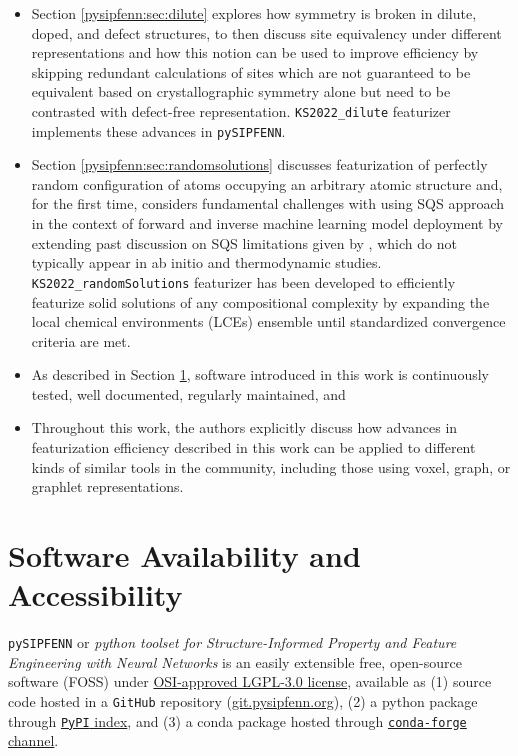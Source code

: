 \begin{itemize}
    
    \item Section \ref{pysipfenn:sec:dilute} explores how symmetry is broken in dilute, doped, and defect structures, to then discuss site equivalency under different representations and how this notion can be used to improve efficiency by skipping redundant calculations of sites which are not guaranteed to be equivalent based on crystallographic symmetry alone but need to be contrasted with defect-free representation. \texttt{KS2022\_dilute} featurizer implements these advances in \texttt{pySIPFENN}.

    \item Section \ref{pysipfenn:sec:randomsolutions} discusses featurization of perfectly random configuration of atoms occupying an arbitrary atomic structure and, for the first time, considers fundamental challenges with using SQS approach in the context of forward and inverse machine learning model deployment by extending past discussion on SQS limitations given by \citet{VanDeWalle2013EfficientStructures}, which do not typically appear in ab initio and thermodynamic studies. \texttt{KS2022\_randomSolutions} featurizer 
    has been developed to efficiently featurize solid solutions of any compositional complexity by expanding the local chemical environments (LCEs) ensemble until standardized convergence criteria are met.

    \item As described in Section \ref{pysipfenn:sec:softwareavaialbility}, software introduced in this work is continuously tested, well documented, regularly maintained, and 

    \item Throughout this work, the authors explicitly discuss how advances in featurization efficiency described in this work can be applied to different kinds of similar tools in the community, including those using voxel, graph, or graphlet representations.
    
\end{itemize}


\section{Software Availability and Accessibility} \label{pysipfenn:sec:softwareavaialbility}

\texttt{pySIPFENN} or \textit{python toolset for Structure-Informed Property and Feature Engineering with Neural Networks} is an easily extensible free, open-source software (FOSS) under \href{https://opensource.org/license/lgpl-3-0}{OSI-approved LGPL-3.0 license}, available as (1) source code hosted in a \texttt{GitHub} repository (\href{https://git.pysipfenn.org/}{git.pysipfenn.org}), (2) a python package through \href{https://pypi.org/project/pysipfenn/}{\texttt{PyPI} index}, and (3) a conda package hosted through \href{https://anaconda.org/conda-forge/pysipfenn}{\texttt{conda-forge} channel}.

